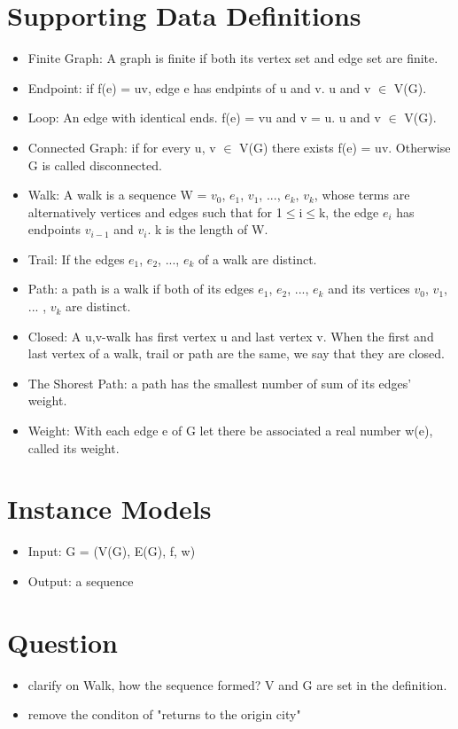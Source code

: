 \documentclass[12pt]{article}
\begin{document}
\section{Supporting Data Definitions}
\begin{itemize}
    \item Finite Graph: A graph is finite if both its vertex set and edge set are finite.
    \item Endpoint: if f(e) = uv, edge e has endpints of u and v. u and v $\in$  V(G).
    \item Loop: An edge with identical ends. f(e) = vu and v = u. u and v $\in$  V(G).
    \item Connected Graph: if for every u, v $\in$  V(G) there exists f(e) = uv. Otherwise G is called disconnected.
    \item Walk: A walk is a sequence W = {$v_0$, $e_1$, $v_1$, $...$, $e_k$, $v_k$}, whose terms are alternatively vertices 
    and edges such that for 1$\le$i$\le$k, the edge $e_i$ has endpoints $v_{i-1}$ and $v_i$. k is the length of W.
    \item Trail: If the edges $e_1$, $e_2$, $...$, $e_k$ of a walk are distinct.
    \item Path: a path is a walk if both of its edges $e_1$, $e_2$, $...$, $e_k$ and its vertices $v_0$, $v_1$, $...$ , $v_k$ are distinct.
    \item Closed: A u,v-walk has first vertex u and last vertex v. 
    When the first and last vertex of a walk, trail or path are the same, we say that they are closed. 
    \item The Shorest Path: a path has the smallest number of sum of its edges' weight.
    \item Weight: With each edge e of G let there be associated a real number w(e), called its weight.
\end{itemize}

\section{Instance Models}
\begin{itemize}
    \item Input: G = (V(G), E(G), f, w)
    \item Output: a sequence
\end{itemize}

\section{Question}
\begin{itemize}
    \item clarify on Walk, how the sequence formed? V and G are set in the definition.
    \item remove the conditon of "returns to the origin city"
\end{itemize}
\end{document}
